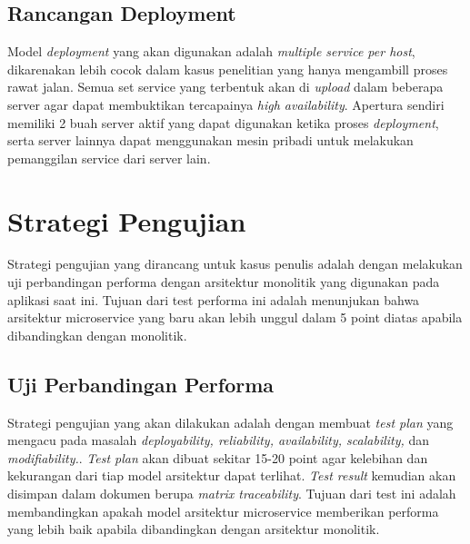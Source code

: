\subsection{Rancangan Deployment}
Model \textit{deployment} yang akan digunakan adalah \textit{multiple service per host}, dikarenakan lebih cocok dalam kasus penelitian yang hanya mengambill proses rawat jalan. Semua set service yang terbentuk akan di \textit{upload} dalam beberapa server agar dapat membuktikan tercapainya \textit{high availability}. Apertura sendiri memiliki 2 buah server aktif yang dapat digunakan ketika proses \textit{deployment}, serta server lainnya dapat menggunakan mesin pribadi untuk melakukan pemanggilan service dari server lain.
\section{Strategi Pengujian}
Strategi pengujian yang dirancang untuk kasus penulis adalah dengan melakukan uji perbandingan performa dengan arsitektur monolitik yang digunakan pada aplikasi saat ini. Tujuan dari test performa ini adalah menunjukan bahwa arsitektur microservice yang baru akan lebih unggul dalam 5 point diatas apabila dibandingkan dengan monolitik.
\subsection{Uji Perbandingan Performa}
Strategi pengujian yang akan dilakukan adalah dengan membuat \textit{test plan} yang mengacu pada masalah \textit{deployability, reliability, availability, scalability,} dan \textit{modifiability.}. \textit{Test plan} akan dibuat sekitar 15-20 point agar kelebihan dan kekurangan dari tiap model arsitektur dapat terlihat. \textit{Test result} kemudian akan disimpan dalam dokumen berupa \textit{matrix traceability}.
Tujuan dari test ini adalah membandingkan apakah model arsitektur microservice memberikan performa yang lebih baik apabila dibandingkan dengan arsitektur monolitik.
\newpage

